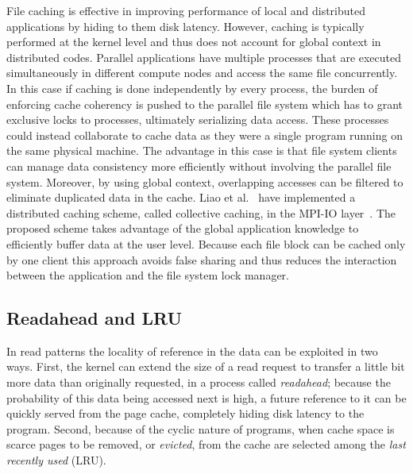 File caching is effective in improving performance of local and distributed applications by hiding to them disk latency. However, caching is typically performed at the kernel level and thus does not account for global context in 
distributed codes. Parallel applications have multiple processes that are executed simultaneously in different compute nodes and access the same file concurrently. In this case if caching is done independently by every process, the 
burden of enforcing cache coherency is pushed to the parallel file system which has to grant exclusive locks to processes, ultimately serializing data access. These processes could instead collaborate to cache data as they were a 
single program running on the same physical machine. The advantage in this case is that file system clients can manage data consistency more efficiently without involving the parallel file system. Moreover, by using global context, 
overlapping accesses can be filtered to eliminate duplicated data in the cache. Liao et al.~\cite{Liao2005} have implemented a distributed caching scheme, called collective caching, in the MPI-IO layer~\cite{mpispecs}. The proposed 
scheme takes advantage of the global application knowledge to efficiently buffer data at the user level. Because each file block can be cached only by one client this approach avoids false sharing and thus reduces the interaction 
between the application and the file system lock manager.

\subsection{Readahead and LRU}
In read patterns the locality of reference in the data can be exploited in two ways. First, the kernel can extend the size of a read request to transfer a little bit more data than originally requested, in a process called \textit{
readahead}; because the probability of this data being accessed next is high, a future reference to it can be quickly served from the page cache, completely hiding disk latency to the program. Second, because of the cyclic nature 
of programs, when cache space is scarce pages to be removed, or \textit{evicted}, from the cache are selected among the \textit{last recently used} (LRU).

